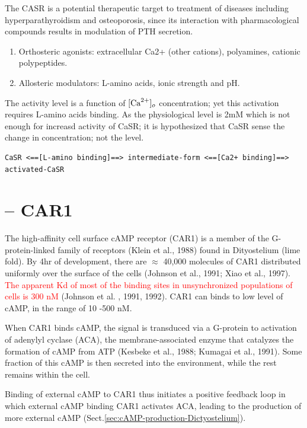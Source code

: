 The CASR is a potential therapeutic target to treatment of diseases including
hyperparathyroidism and osteoporosis, since its interaction with pharmacological
compounds results in modulation of PTH secretion.

\begin{enumerate} 
  \item Orthosteric agonists: extracellular Ca2+ (other cations), polyamines,
  cationic polypeptides.

  \item Allosteric modulators: L-amino acids, ionic strength and pH.
  
\end{enumerate}

The activity level is a function of $[{\text{Ca}^{2+}}]_o$ concentration; yet this activation
requires L-amino acids binding. As the physiological level is 2mM which is not
enough for increasd activity of CaSR; it is hypothesized that CaSR sense the
change in concentration; not the level.

{\small
\begin{verbatim}
CaSR <==[L-amino binding]==> intermediate-form <==[Ca2+ binding]==> activated-CaSR
\end{verbatim}
}


\section{-- CAR1}
\label{sec:CAR1}

The high-affinity  cell  surface cAMP  receptor  (CAR1)  is  a  member of  the
G-protein-linked family of receptors (Klein et al., 1988) found in Dityostelium
(lime fold). By 4hr of development, there are $\approx$ 40,000 molecules of CAR1
distributed uniformly  over  the  surface  of  the cells (Johnson et al., 1991;
Xiao et al., 1997). \textcolor{red}{The apparent Kd of most of the binding sites
in unsynchronized populations of cells is  300 nM} (Johnson et al. , 1991,
1992). CAR1 can binds to low level of cAMP, in the range of 10 -500 nM.


When  CAR1  binds  cAMP,  the  signal  is  transduced via a G-protein to
activation of adenylyl cyclase (ACA),  the  membrane-associated  enzyme  that
catalyzes the formation of cAMP from ATP (Kesbeke et al., 1988; Kumagai et al.,
1991).  Some fraction of this cAMP is  then  secreted  into  the  environment, 
while  the  rest remains within the cell.

Binding of external cAMP to CAR1 thus initiates a positive feedback loop in
which external cAMP binding CAR1 activates ACA, leading to the production of
more external cAMP (Sect.\ref{sec:cAMP-production-Dictyostelium}).

